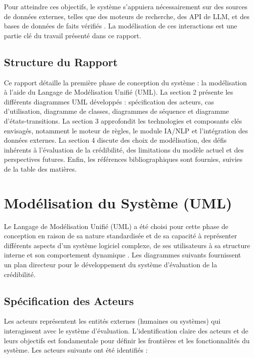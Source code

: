 \documentclass[9pt,twocolumn,french]{article}
\begin{document}
Pour atteindre ces objectifs, le système s'appuiera nécessairement sur des sources de données externes, telles que des moteurs de recherche, des API de LLM, et des bases de données de faits vérifiés \citep{Viviani2017}. La modélisation de ces interactions est une partie clé du travail présenté dans ce rapport.

\subsection{Structure du Rapport}

Ce rapport détaille la première phase de conception du système : la modélisation à l'aide du Langage de Modélisation Unifié (UML). La section 2 présente les différents diagrammes UML développés : spécification des acteurs, cas d'utilisation, diagramme de classes, diagrammes de séquence et diagramme d'états-transitions. La section 3 approfondit les technologies et composants clés envisagés, notamment le moteur de règles, le module IA/NLP et l'intégration des données externes. La section 4 discute des choix de modélisation, des défis inhérents à l'évaluation de la crédibilité, des limitations du modèle actuel et des perspectives futures. Enfin, les références bibliographiques sont fournies, suivies de la table des matières.

\section{Modélisation du Système (UML)}

Le Langage de Modélisation Unifié (UML) a été choisi pour cette phase de conception en raison de sa nature standardisée et de sa capacité à représenter différents aspects d'un système logiciel complexe, de ses utilisateurs à sa structure interne et son comportement dynamique \citep{Fowler1998Uml, Larman2004Applying}. Les diagrammes suivants fournissent un plan directeur pour le développement du système d'évaluation de la crédibilité.

\subsection{Spécification des Acteurs}

Les acteurs représentent les entités externes (humaines ou systèmes) qui interagissent avec le système d'évaluation. L'identification claire des acteurs et de leurs objectifs est fondamentale pour définir les frontières et les fonctionnalités du système. Les acteurs suivants ont été identifiés :
\end{document}
